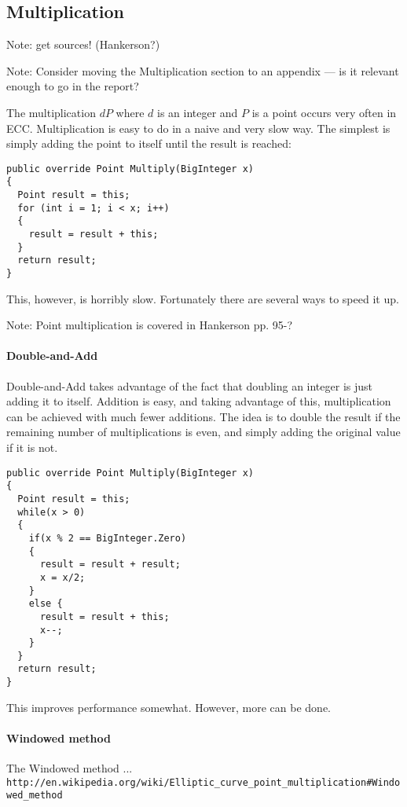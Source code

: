 \subsection{Multiplication}

Note: get sources! (Hankerson?)

Note: Consider moving the Multiplication section to an appendix --- is it relevant enough to go in the report?

The multiplication \(dP\) where \(d\) is an integer and \(P\) is a point occurs very often in ECC. Multiplication
is easy to do in a naive and very slow way. The simplest is simply adding the point to itself until the result is
reached:

\begin{verbatim}
public override Point Multiply(BigInteger x)
{
  Point result = this;
  for (int i = 1; i < x; i++)
  {
    result = result + this;
  }
  return result;
}
\end{verbatim}

This, however, is horribly slow. Fortunately there are several ways to speed it up.

Note: Point multiplication is covered in Hankerson pp. 95-?

\paragraph{Double-and-Add}

Double-and-Add takes advantage of the fact that doubling an integer is just adding it to itself. Addition is easy,
and taking advantage of this, multiplication can be achieved with much fewer additions. The idea is to double the
result if the remaining number of multiplications is even, and simply adding the original value if it is not.

\begin{verbatim}
public override Point Multiply(BigInteger x)
{
  Point result = this;
  while(x > 0)
  {
    if(x % 2 == BigInteger.Zero)
    {
      result = result + result;
      x = x/2;
    }
    else {
      result = result + this;
      x--;
    }
  }
  return result;
}
\end{verbatim}

This improves performance somewhat. However, more can be done.

\paragraph{Windowed method}

The Windowed method ... \verb+http://en.wikipedia.org/wiki/Elliptic_curve_point_multiplication#Windowed_method+